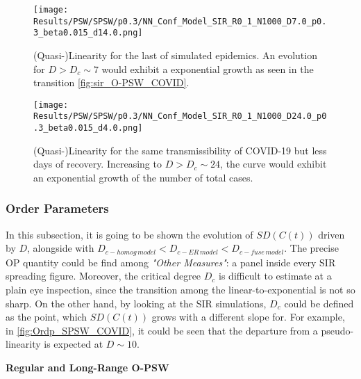 \documentclass[a4paper,10pt,twoside]{book} %
\theoremstyle{definition}
\begin{document}
\begin{figure}[h]
		\texttt{[image: Results/PSW/SPSW/p0.3/NN\_Conf\_Model\_SIR\_R0\_1\_N1000\_D7.0\_p0.3\_beta0.015\_d14.0.png]}
	\caption{(Quasi-)Linearity for the last of simulated epidemics. An evolution for $D > D_c \sim 7$ would exhibit a exponential growth as seen in the transition \autoref{fig:sir_O-PSW_COVID}.}
	\label{fig:sir_SPSW_p0.3_D7}
\end{figure}

\begin{figure}[h]
	\texttt{[image: Results/PSW/SPSW/p0.3/NN\_Conf\_Model\_SIR\_R0\_1\_N1000\_D24.0\_p0.3\_beta0.015\_d4.0.png]}
\caption{(Quasi-)Linearity for the same transmissibility of COVID-19 but less days of recovery. Increasing to $D > D_c \sim 24$, the curve would exhibit an exponential growth of the number of total cases.}
\label{fig:sir_SPSW_p0.3_D24}
\end{figure}


\newpage
\subsubsection*{Order Parameters}
In this subsection, it is going to be shown the evolution of $SD(C(t))$ driven by $D$, alongside with $D_{c-homog \, model} < D_{c-ER \, model} < D_{c-fuse \, model}$. The precise OP quantity could be find among \textit{"Other Measures"}: a panel inside every SIR spreading figure. Moreover, the critical degree $D_c$ is difficult to estimate at a plain eye inspection, since the transition among the linear-to-exponential is not so sharp. On the other hand, by looking at the SIR simulations, $D_c$ could be defined as the point, which $SD(C(t))$ grows with a different slope for.
For example, in \autoref{fig:Ordp_SPSW_COVID}, it could be seen that the departure from a pseudo-linearity is expected at $D \sim 10$.

\textbf{Regular and Long-Range O-PSW}
\end{document}
